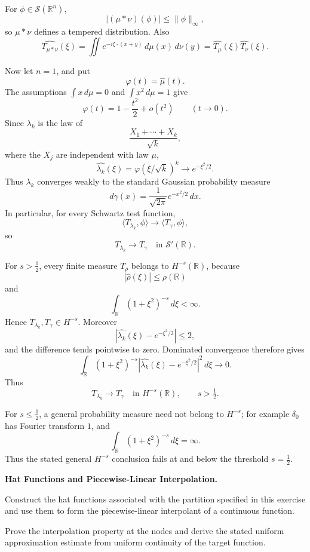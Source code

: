 \begin{solution}
For \(\phi\in\mathcal S(\mathbb R^n)\),
\[
|(\mu*\nu)(\phi)|
\le\|\phi\|_\infty,
\]
so \(\mu*\nu\) defines a tempered distribution. Also
\[
\widehat{T_{\mu*\nu}}(\xi)
=
\iint e^{-i\xi\cdot(x+y)}\,d\mu(x)\,d\nu(y)
=
\widehat{T_\mu}(\xi)\widehat{T_\nu}(\xi).
\]

Now let \(n=1\), and put
\[
\varphi(t)=\widehat\mu(t).
\]
The assumptions \(\int x\,d\mu=0\) and \(\int x^2\,d\mu=1\) give
\[
\varphi(t)=1-\frac{t^2}{2}+o(t^2)
\qquad(t\to0).
\]
Since \(\lambda_k\) is the law of
\[
\frac{X_1+\cdots+X_k}{\sqrt{k}},
\]
where the \(X_j\) are independent with law \(\mu\),
\[
\widehat{\lambda_k}(\xi)
=
\varphi(\xi/\sqrt{k})^k
\longrightarrow
e^{-\xi^2/2}.
\]
Thus \(\lambda_k\) converges weakly to the standard Gaussian probability measure
\[
d\gamma(x)=\frac{1}{\sqrt{2\pi}}e^{-x^2/2}\,dx.
\]
In particular, for every Schwartz test function,
\[
\langle T_{\lambda_k},\phi\rangle\to\langle T_\gamma,\phi\rangle,
\]
so
\[
\boxed{T_{\lambda_k}\to T_\gamma\quad\text{in }\mathcal S'(\mathbb R).}
\]

For \(s>\tfrac12\), every finite measure \(T_\rho\) belongs to \(H^{-s}(\mathbb R)\),
because
\[
|\widehat\rho(\xi)|\le \rho(\mathbb R)
\]
and
\[
\int_{\mathbb R}(1+\xi^2)^{-s}\,d\xi<\infty.
\]
Hence \(T_{\lambda_k},T_\gamma\in H^{-s}\). Moreover
\[
|\widehat{\lambda_k}(\xi)-e^{-\xi^2/2}|\le2,
\]
and the difference tends pointwise to zero. Dominated convergence therefore gives
\[
\int_{\mathbb R}(1+\xi^2)^{-s}
|\widehat{\lambda_k}(\xi)-e^{-\xi^2/2}|^2\,d\xi
\longrightarrow0.
\]
Thus
\[
\boxed{T_{\lambda_k}\to T_\gamma\quad\text{in }H^{-s}(\mathbb R),\qquad s>\tfrac12.}
\]

For \(s\le\tfrac12\), a general probability measure need not belong to \(H^{-s}\);
for example \(\delta_0\) has Fourier transform \(1\), and
\[
\int_{\mathbb R}(1+\xi^2)^{-s}\,d\xi=\infty.
\]
Thus the stated general \(H^{-s}\) conclusion fails at and below the threshold
\(s=\tfrac12\).
\end{solution}

\begin{problem}[CP-II-0065]
\label{prob:cp-ii-0065}
\textbf{Hat Functions and Piecewise-Linear Interpolation.}

\hspace*{1.5em}Construct the hat functions associated with the partition specified in this
exercise and use them to form the piecewise-linear interpolant of a continuous
function.

Prove the interpolation property at the nodes and derive the stated uniform
approximation estimate from uniform continuity of the target function.
\end{problem}

